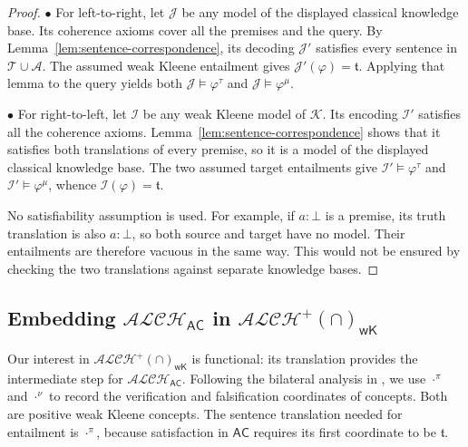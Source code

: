 \documentclass[letterpaper]{article} %
\theoremstyle{definition}
\theoremstyle{definition}
\theoremstyle{definition}
\theoremstyle{definition}
\theoremstyle{definition}
\newcommand{\vt}{\mathfrak{t}}
\begin{document}
\begin{proof}
\noindent$\bullet$ For left-to-right, let $\mathcal{J}$ be any model of the displayed classical knowledge base. Its coherence axioms cover all the premises and the query. By Lemma~\ref{lem:sentence-correspondence}, its decoding $\mathcal{J}'$ satisfies every sentence in $\mathcal{T}\cup\mathcal{A}$. The assumed weak Kleene entailment gives $\mathcal{J}'(\varphi)=\vt$. Applying that lemma to the query yields both $\mathcal{J}\models\varphi^{\tau}$ and $\mathcal{J}\models\varphi^{\mu}$.

\noindent$\bullet$ For right-to-left, let $\mathcal{I}$ be any weak Kleene model of $\mathcal{K}$. Its encoding $\mathcal{I}'$ satisfies all the coherence axioms. Lemma~\ref{lem:sentence-correspondence} shows that it satisfies both translations of every premise, so it is a model of the displayed classical knowledge base. The two assumed target entailments give $\mathcal{I}'\models\varphi^{\tau}$ and $\mathcal{I}'\models\varphi^{\mu}$, whence $\mathcal{I}(\varphi)=\vt$.

No satisfiability assumption is used. For example, if $a:\bot$ is a premise, its truth translation is also $a:\bot$, so both source and target have no model. Their entailments are therefore vacuous in the same way. This would not be ensured by checking the two translations against separate knowledge bases.
\end{proof}

\subsection{Embedding $\mathcal{ALCH}_{\mathsf{AC}}$ in $\mathcal{ALCH}^+(\cap)_{\mathsf{wK}}$}

Our interest in $\mathcal{ALCH}^{+}(\cap)_{\mathsf{wK}}$ is functional: its translation provides the intermediate step for $\mathcal{ALCH}_{\mathsf{AC}}$. Following the bilateral analysis in \cite{DBLP:journals/logcom/Ferguson16}, we use $\cdot^{\pi}$ and $\cdot^{\nu}$ to record the verification and falsification coordinates of concepts. Both are positive weak Kleene concepts. The sentence translation needed for entailment is $\cdot^{\pi}$, because satisfaction in $\mathsf{AC}$ requires its first coordinate to be $\vt$.
\end{document}
